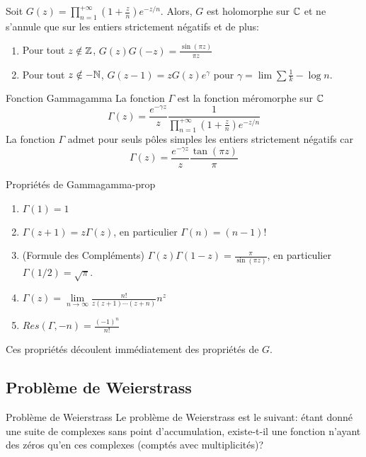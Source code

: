 \documentclass{cours}
\begin{document}
\begin{lemme}
	{}{}
	Soit $G(z) = \prod_{n = 1}^{+\infty} \left(1 + \frac{z}{n}\right) e^{-z/n}$.
	Alors, $G$ est holomorphe sur $\mathbb{C}$ et ne s'annule que sur les entiers strictement négatifs et de plus: 
	\begin{enumerate}
		\item Pour tout $z \notin \mathbb{Z}$, $G(z)G(-z) = \frac{\sin(\pi z)}{\pi z}$
		\item Pour tout $z \notin -\mathbb{N}$, $G(z - 1) = z G(z)e^{\gamma}$ pour $\gamma = \lim \sum \frac{1}{k} - \log n$. 
	\end{enumerate}
\end{lemme}


\begin{définition}
	{Fonction Gamma}{gamma}
	La fonction $\Gamma$ est la fonction méromorphe sur $\mathbb{C}$
	\begin{equation*}
		\Gamma(z)=\frac{e^{-\gamma z}}{z}\frac{1}{\prod_{n = 1}^{+\infty}\left(1 + \frac{z}{n}\right)e^{-z/n}}
	\end{equation*}
	La fonction $\Gamma$ admet pour seuls pôles simples les entiers strictement négatifs car 
	\begin{equation*}
		\Gamma(z) = \frac{e^{-\gamma z}}{z}\frac{\tan(\pi z)}{\pi}
	\end{equation*}
\end{définition}

\begin{propositionfr}
	{Propriétés de Gamma}{gamma-prop}
	\begin{enumerate}
		\item $\Gamma(1) = 1$
		\item $\Gamma(z + 1) = z \Gamma(z)$, en particulier $\Gamma(n) = (n - 1)!$
		\item (Formule des Compléments) $\Gamma(z) \Gamma(1 - z) = \frac{\pi}{\sin(\pi z)}$, en particulier $\Gamma(1/2) = \sqrt{\pi}$.
		\item $\Gamma(z) = \lim\limits_{n \to \infty} \frac{n!}{z(z + 1)\cdots(z + n)}n^{z}$
		\item $Res(\Gamma, -n) = \frac{(-1)^{n}}{n!}$
	\end{enumerate}
\end{propositionfr}
Ces propriétés découlent immédiatement des propriétés de $G$. 

\subsection{Problème de Weierstrass}
\begin{définition}
	{Problème de Weierstrass}{}
	Le problème de Weierstrass est le suivant: étant donné une suite de complexes sans point d'accumulation, existe-t-il une fonction n'ayant des zéros qu'en ces complexes (comptés avec multiplicités)?
\end{définition}
\end{document}
